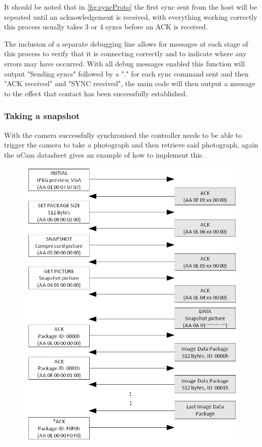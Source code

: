 It should be noted that in \ref{fig:syncProto} the first sync sent from the host will be repeated until an acknowledgement is received, with everything working correctly this process usually takes 3 or 4 syncs before an ACK is received.

The inclusion of a separate debugging line allows for messages at each stage of this process to verify that it is connecting correctly and to indicate where any errors may have occurred. With all debug messages enabled this function will output "Sending syncs" followed by a "." for each sync command sent and then "ACK received" and "SYNC received", the main code will then output a message to the effect that contact has been successfully established.

\subsubsection{Taking a snapshot}

With the camera successfully synchronised the controller needs to be able to trigger the camera to take a photograph and then retrieve said photograph, again the uCam datasheet gives an example of how to implement this.

\begin{figure}[H]
        \centering
        \includegraphics[width=1.00\textwidth]{figures/SnapshotProtocal.png}
        \label{fig:snapProto}
\end{figure}

